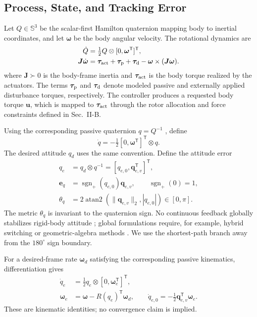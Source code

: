 \documentclass[letterpaper, 10 pt, conference]{ieeeconf}
\newcommand{\T}{^{\mathsf T}}
\newcommand{\sgnp}{\operatorname{sgn}_{+}}
\begin{document}
\subsection{Process, State, and Tracking Error}

Let $Q\in\mathbb S^3$ be the scalar-first Hamilton quaternion mapping body to
inertial coordinates, and let $\bm\omega$ be the body angular velocity. The
rotational dynamics are \cite{schaub2018amss}
\begin{align}
 \dot Q&=\tfrac12 Q\otimes[0,\bm\omega\T]\T,\\
 \bm J\dot{\bm\omega}&=\bm\tau_{\rm act}+\bm\tau_{\rm p}
       +\bm\tau_{\rm d}-\bm\omega\times(\bm J\bm\omega).
 \label{eq:plant}
\end{align}
where $\bm J\succ0$ is the body-frame inertia and
$\bm\tau_{\rm act}$ is the body torque realized by the actuators.
The terms $\bm\tau_{\rm p}$ and $\bm\tau_{\rm d}$ denote modeled
passive and externally applied disturbance torques, respectively.
The controller produces a requested body torque $\bm u$, which is
mapped to $\bm\tau_{\rm act}$ through the rotor allocation and force
constraints defined in Sec.~II-B.

Using the corresponding passive quaternion $q=Q^{-1}$ \cite{diebel2006quaternion}, define
\begin{equation}
 \dot q=-\tfrac12[0,\bm\omega\T]\T\otimes q.
 \label{eq:passive}
\end{equation}
The desired attitude $q_d$ uses the same convention. Define the attitude error
\begin{align}
 q_e&=q_d\otimes q^{-1}=[q_{e,0},\bm q_{e,v}\T]\T,\\
 \bm e_q&=\sgnp(q_{e,0})\bm q_{e,v},\qquad \sgnp(0)=1,\\
 \theta_q&=2\operatorname{atan2}(\|\bm q_{e,v}\|_2,|q_{e,0}|)
             \in[0,\pi].
 \label{eq:theta}
\end{align}
The metric $\theta_q$ is invariant to the quaternion sign. No continuous feedback globally stabilizes rigid-body attitude \cite{chaturvedi2011rigid}; global formulations require, for example, hybrid switching \cite{mayhew2011hybrid} or geometric-algebra methods \cite{rubioscola2026ga}. We use the shortest-path branch away from the $180^\circ$ sign boundary.

For a desired-frame rate $\bm\omega_d$ satisfying the corresponding passive kinematics, differentiation gives
\begin{align}
 \dot q_e&=\tfrac12q_e\otimes[0,\bm\omega_e\T]\T,\\
 \bm\omega_e&=\bm\omega-R(q_e)\T\bm\omega_d,\qquad
 \dot q_{e,0}=-\tfrac12\bm q_{e,v}\T\bm\omega_e.
 \label{eq:errkin}
\end{align}
These are kinematic identities; no convergence claim is implied.
\end{document}
